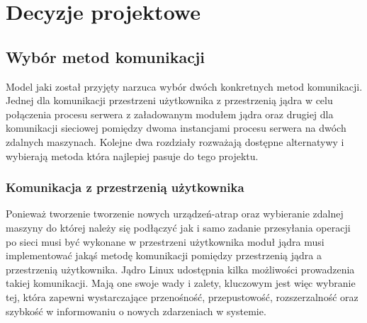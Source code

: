 \documentclass[10pt]{scrartcl}
\begin{document}
\section{Decyzje projektowe}

\subsection{Wybór metod komunikacji}

Model jaki został przyjęty narzuca wybór dwóch konkretnych metod komunikacji. Jednej dla komunikacji przestrzeni użytkownika z przestrzenią jądra w celu połączenia procesu serwera z załadowanym modułem jądra oraz drugiej dla komunikacji sieciowej pomiędzy dwoma instancjami procesu serwera na dwóch zdalnych maszynach. Kolejne dwa rozdziały rozważają dostępne alternatywy i wybierają metoda która najlepiej pasuje do tego projektu.

\subsubsection{Komunikacja z przestrzenią użytkownika}
\label{userlandcomm}

Ponieważ tworzenie tworzenie nowych urządzeń-atrap oraz wybieranie zdalnej maszyny do której należy się podłączyć jak i samo zadanie przesyłania operacji po sieci musi być wykonane w przestrzeni użytkownika moduł jądra musi implementować jakąś metodę komunikacji pomiędzy przestrzenią jądra a przestrzenią użytkownika. Jądro Linux udostępnia kilka możliwości prowadzenia takiej komunikacji. Mają one swoje wady i zalety, kluczowym jest więc wybranie tej, która zapewni wystarczające przenośność, przepustowość, rozszerzalność oraz szybkość w informowaniu o nowych zdarzeniach w systemie.
\end{document}
